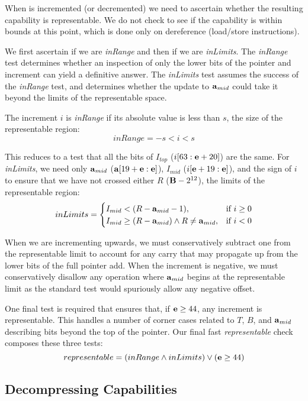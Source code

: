 When \caddr{} is incremented (or decremented) we need to ascertain
whether the resulting capability is representable.  We do not check to
see if the capability is within bounds at this point, which is done
only on dereference (load/store instructions).

We first ascertain if we are \emph{inRange} and then if we are \emph{inLimits}.
The \emph{inRange} test determines whether an inspection of only the lower bits of
the pointer and increment can yield a definitive answer.
The \emph{inLimits} test assumes the success of the \emph{inRange} test, and determines
whether the update to ${\bf a}{}_{mid}$ could take it beyond the limits of the representable space.

The increment $i$ is \emph{inRange} if its absolute value is less than $s$, the size of the
representable region:
\[ inRange = -s < i < s\]

This reduces to a test that all the bits of $I_{top}$ ($i[63:{\bf e}{}+20]$) are the same.
For \emph{inLimits}, we need only ${\bf a}{}_{mid}$ (${\bf a}{}[19+{\bf e}{}:{\bf e}{}]$),
$I_{mid}$ ($i[{\bf e}{}+19:{\bf e}{}]$), and the sign of $i$ to ensure that we have not
crossed either $R$ (${\bf B}{} - 2^{12}$), the limits of the representable region:
\[
  inLimits=\begin{cases}
                   I_{mid} < (R - {\bf a}{}_{mid} - 1),& \text{if } i \geq 0 \\
                   I_{mid} \geq (R - {\bf a}{}_{mid}) \land R \neq {\bf a}{}_{mid},& \text{if } i < 0 \\
                \end{cases}
\]

When we are incrementing upwards, we must conservatively subtract one from the representable limit
to account for any carry that may propagate up from the lower
bits of the full pointer add.
When the increment is negative, we must conservatively disallow any operation where ${\bf a}{}_{mid}$ begins
at the representable limit as the standard test would spuriously allow any negative offset.

One final test is required that ensures that, if ${\bf e}{} \geq 44$, any increment is representable.
This handles a number of corner cases related to $T$, $B$, and ${\bf a}{}_{mid}$ describing
bits beyond the top of the pointer.
Our final fast \emph{representable} check composes these three tests:
\[ representable = (inRange  \land  inLimits)  \lor  ({\bf e}{} \geq 44)\]


\subsection{Decompressing Capabilities}

